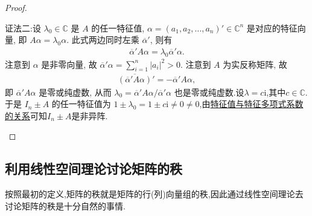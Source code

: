 \documentclass[../../main.tex]{subfiles}
\begin{document}
\begin{proof}
\begin{enumerate}[(1)]
{\color{blue}证法二:}设 $\lambda_0 \in \mathbb{C}$ 是 $A$ 的任一特征值, $\alpha = (a_1, a_2, \dots, a_n)' \in \mathbb{C}^n$ 是对应的特征向量, 即 $A\alpha = \lambda_0 \alpha$. 此式两边同时左乘 $\overline{\alpha }' $, 则有
\begin{align*}
\overline{\alpha }'  A \alpha = \lambda_0 \overline{\alpha }'  \alpha.
\end{align*}
注意到 $\alpha$ 是非零向量, 故 $\overline{\alpha }' \alpha = \sum_{i=1}^n |a_i|^2 > 0$. 注意到 $A$ 为实反称矩阵, 故
\begin{align*}
\overline{(\overline{\alpha }'  A\alpha )}' = -\overline{\alpha }' A \alpha,
\end{align*}
即 $\overline{\alpha }'  A \alpha$ 是零或纯虚数, 从而 $\lambda_0 = \overline{\alpha }'  A \alpha / \overline{\alpha }'  \alpha$ 也是零或纯虚数.设$\lambda=c\mathrm{i}$,其中$c\in \mathbb{C}$.
于是 $I_n \pm A$ 的任一特征值为 $1 \pm \lambda_0 = 1 \pm c\mathrm{i} \neq 0\ne 0$,由\hyperref[proposition:特征值与特征多项式系数的关系]{特征值与特征多项式系数的关系}可知$I_n\pm A$是非异阵.
\end{enumerate}
\end{proof}



\subsection{利用线性空间理论讨论矩阵的秩}
按照最初的定义,矩阵的秩就是矩阵的行(列)向量组的秩,因此通过线性空间理论去讨论矩阵的秩是十分自然的事情.
\end{document}
